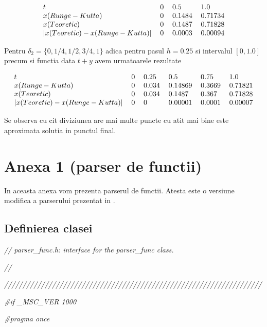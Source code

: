 \documentclass[a4paper,twoside]{book}
\begin{document}
\begin{equation*}
\begin{tabular}{llll}
$t$ & 0 & 0.5 & 1.0 \\ 
$x(Runge-Kutta)$ & 0 & 0.1484 & 0.71734 \\ 
$x(Teoretic)$ & 0 & 0.1487 & 0.71828 \\ 
$\left\vert x(Teoretic)-x(Runge-Kutta)\right\vert $ & 0 & 0.0003 & 0.00094%
\end{tabular}%
\end{equation*}

Pentru $\delta _{2}=\{0,1/4,1/2,3/4,1\}$ adica pentru pasul $h=0.25$ si
intervalul $[0,1.0]$ precum si functia data $t+y$ avem urmatoarele rezultate

\begin{equation*}
\begin{tabular}{llllll}
$t$ & 0 & 0.25 & 0.5 & 0.75 & 1.0 \\ 
$x(Runge-Kutta)$ & 0 & 0.034 & 0.14869 & 0.3669 & 0.71821 \\ 
$x(Teoretic)$ & 0 & 0.034 & 0.1487 & 0.367 & 0.71828 \\ 
$\left\vert x(Teoretic)-x(Runge-Kutta)\right\vert $ & 0 & 0 & 0.00001 & 
0.0001 & 0.00007%
\end{tabular}%
\end{equation*}

Se observa cu cit diviziunea are mai multe puncte cu atit mai bine este
aproximata solutia in punctul final.

\chapter{Anexa 1 (parser de functii)}

\bigskip In aceasta anexa vom prezenta parserul de functii. Atesta este o
versiune modifica a parserului prezentat in \cite{Schildt}.

\section{Definierea clasei}

\textit{// parser\_func.h: interface for the parser\_func class.}

\textit{//}

\textit{%
//////////////////////////////////////////////////////////////////////}

\textit{\#if \_MSC\_VER \TEXTsymbol{>} 1000}

\textit{\#pragma once}
\end{document}
